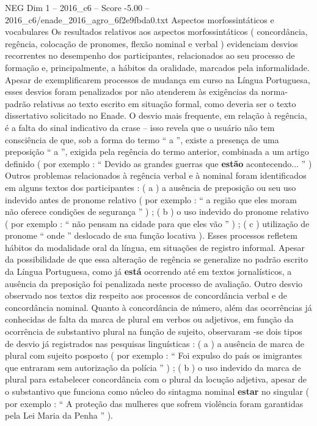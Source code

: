 \begin{textsample}{NEG Dim 1 – 2016\_c6 – Score -5.00 – 2016\_c6/enade\_2016\_agro\_6f2e9fbda0.txt}
Aspectos morfossintáticos e vocabulares Os resultados relativos aos aspectos morfossintáticos ( concordância, regência, colocação de pronomes, flexão nominal e verbal ) evidenciam desvios recorrentes no desempenho dos participantes, relacionados ao seu processo de formação e, principalmente, a hábitos da oralidade, marcados pela informalidade.
Apesar de exemplificarem processos de mudança em curso na Língua Portuguesa, esses desvios foram penalizados por não atenderem às exigências da norma-padrão relativas ao texto escrito em situação formal, como deveria ser o texto dissertativo solicitado no Enade.
O desvio mais frequente, em relação à regência, é a falta do sinal indicativo da crase – isso revela que o usuário não tem consciência de que, sob a forma do termo “ a ”, existe a presença de uma preposição “ a ”, exigida pela regência do termo anterior, combinada a um artigo definido ( por exemplo : “ Devido as grandes guerras que \textbf{estão} acontecendo... ” ) Outros problemas relacionados à regência verbal e à nominal foram identificados em alguns textos dos participantes : ( a ) a ausência de preposição ou seu uso indevido antes de pronome relativo ( por exemplo : “ a região que eles moram não oferece condições de segurança ” ) ; ( b ) o uso indevido do pronome relativo ( por exemplo : “ não pensam na cidade para que eles vão ” ) ; ( c ) utilização de pronome “ onde ” deslocado de sua função locativa ).
Esses processos refletem hábitos da modalidade oral da língua, em situações de registro informal.
Apesar da possibilidade de que essa alteração de regência se generalize no padrão escrito da Língua Portuguesa, como já \textbf{está} ocorrendo até em textos jornalísticos, a ausência da preposição foi penalizada neste processo de avaliação.
Outro desvio observado nos textos diz respeito aos processos de concordância verbal e de concordância nominal.
Quanto à concordância de número, além das ocorrências já conhecidas de falta da marca de plural em verbos ou adjetivos, em função da ocorrência de substantivo plural na função de sujeito, observaram -se dois tipos de desvio já registrados nas pesquisas linguísticas : ( a ) a ausência de marca de plural com sujeito posposto ( por exemplo : “ Foi expulso do país os imigrantes que entraram sem autorização da polícia ” ) ; ( b ) o uso indevido da marca de plural para estabelecer concordância com o plural da locução adjetiva, apesar de o substantivo que funciona como núcleo do sintagma nominal \textbf{estar} no singular ( por exemplo : “ A proteção das mulheres que sofrem violência foram garantidas pela Lei Maria da Penha ” ).

\end{textsample}
